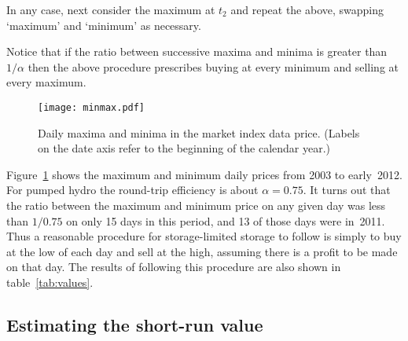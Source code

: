 \documentclass[12pt, a4paper]{article}
\begin{document}
In any case, next consider the maximum at $t_2$ and repeat the above,
swapping `maximum' and `minimum' as necessary.

Notice that if the ratio between successive maxima and minima is
greater than $1/\alpha$ then the above procedure prescribes buying at
every minimum and selling at every maximum. 

\begin{figure}[htb]
\centering
\texttt{[image: minmax.pdf]}
\caption{Daily maxima and minima in the market index data
  price. (Labels on the date axis refer to the beginning of the
  calendar year.)}
\label{fig:minmax}
\end{figure}

Figure~\ref{fig:minmax} shows the maximum and minimum daily prices
from 2003 to early~2012. For pumped hydro the round-trip efficiency is
about $\alpha = 0.75$. It turns out that the ratio between the maximum
and minimum price on any given day was less than $1/0.75$ on only 15
days in this period, and 13 of those days were in~2011. Thus a
reasonable procedure for storage-limited storage to follow is simply
to buy at the low of each day and sell at the high, assuming there is
a profit to be made on that day. The results of following this
procedure are also shown in table~\ref{tab:values}.

\subsection{Estimating the short-run value}
\end{document}
